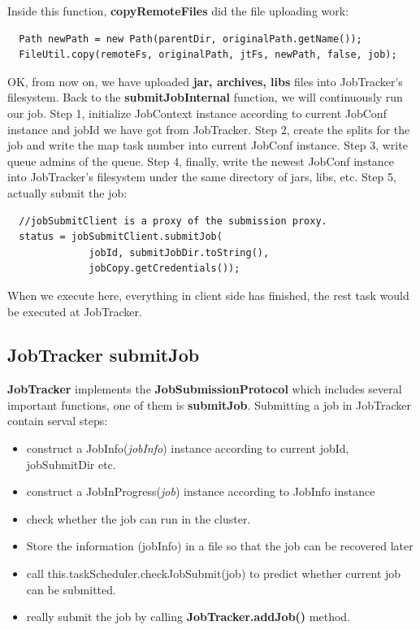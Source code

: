 \documentclass{tufte-book}
\begin{document}
Inside this function, \textbf{copyRemoteFiles} did the file uploading
work:
\begin{lstlisting}
  Path newPath = new Path(parentDir, originalPath.getName());
  FileUtil.copy(remoteFs, originalPath, jtFs, newPath, false, job);
\end{lstlisting}

OK, from now on, we have uploaded \textbf{jar, archives, libs} files into
JobTracker's filesystem. Back to the \textbf{submitJobInternal}
function, we will continuously run our job. Step 1, initialize
JobContext instance according to current JobConf instance and jobId we
have got from JobTracker. Step 2, create the splits for the job and
write the map task number into current JobConf instance. Step 3, write
queue admins of the queue. Step 4, finally, write the newest JobConf
instance into JobTracker's filesystem under the same directory of
jars, libs, etc. Step 5, actually submit the job:
\begin{lstlisting}
  //jobSubmitClient is a proxy of the submission proxy.
  status = jobSubmitClient.submitJob(
              jobId, submitJobDir.toString(),
              jobCopy.getCredentials());
            \end{lstlisting}
When we execute here, everything in client side has finished, the rest
task would be executed at JobTracker.

\subsection{JobTracker submitJob}
\textbf{JobTracker} implements the \textbf{JobSubmissionProtocol}
which includes several important functions, one of them is
\textbf{submitJob}. Submitting a job in JobTracker contain serval
steps:
\begin{itemize}
\item construct a JobInfo(\textit{jobInfo}) instance according to current jobId,
  jobSubmitDir etc.
\item construct a JobInProgress(\textit{job}) instance according to JobInfo
  instance
\item check whether the job can run in the cluster.
\item Store the information (jobInfo) in a file so that the job can be
  recovered later
\item call this.taskScheduler.checkJobSubmit(job) to predict whether
  current job can be submitted.
\item really submit the job by calling \textbf{JobTracker.addJob()} method.
\end{itemize}
\end{document}
